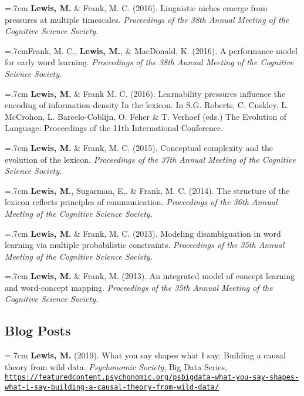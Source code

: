 \documentclass[letterpaper]{article}
\begin{document}
  \hangindent=.7cm {\bf Lewis, M.} \& Frank, M. C. (2016). Linguistic niches emerge from pressures at multiple timescales. { \it Proceedings of the 38th Annual Meeting of the Cognitive Science Society.}

   \hangindent=.7cmFrank, M. C.,  {\bf Lewis, M.}, \& MacDonald, K. (2016). A performance model for early word learning.  { \it Proceedings of the 38th Annual Meeting of the Cognitive Science Society.}

  \hangindent=.7cm {\bf Lewis, M.} \& Frank M. C. (2016). Learnability pressures influence the encoding of information density In the lexicon. In S.G. Roberts, C. Cuskley, L. McCrohon, L. Barcelo-Coblijn, O. Feher \& T. Verhoef (eds.) The Evolution of Language: Proceedings of the 11th International Conference.


 \hangindent=.7cm {\bf Lewis, M.} \& Frank, M. C. (2015). Conceptual complexity and the evolution of the lexicon. { \it Proceedings of the 37th Annual Meeting of the Cognitive Science Society.}

 \hangindent=.7cm {\bf Lewis, M.}, Sugarman, E,. \& Frank, M. C. (2014). The structure of the lexicon reflects principles of communication. { \it Proceedings of the 36th Annual Meeting of the Cognitive Science Society.}

 \hangindent=.7cm {\bf Lewis, M.} \& Frank, M. C. (2013). Modeling disambiguation in word learning via multiple probabilistic constraints. { \it Proceedings of the 35th Annual Meeting of the Cognitive Science Society.}

 \hangindent=.7cm {\bf Lewis, M.} \& Frank, M. (2013). An integrated model of concept learning and word-concept mapping.{ \it Proceedings of the 35th Annual Meeting of the Cognitive Science Society.}

  \subsection*{Blog Posts}
    \hangindent=.7cm {\bf Lewis, M.} (2019). What you say shapes what I say: Building a causal theory from wild data.  { \it Psychonomic Society}, Big Data Series, \href{https://featuredcontent.psychonomic.org/psbigdata-what-you-say-shapes-what-i-say-building-a-causal-theory-from-wild-data/}{\tt https://featuredcontent.psychonomic.org/psbigdata-what-you-say-{\newline}shapes-what-i-say-building-a-causal-theory-from-wild-data/}


 \singlespacing
\end{document}
